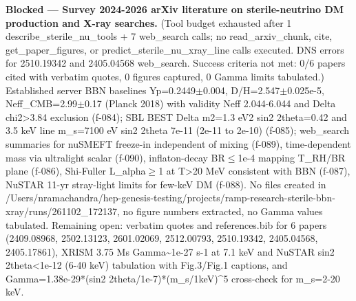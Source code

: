 \documentclass[11pt,a4paper]{article}
\begin{document}
\textbf{Blocked --- Survey 2024-2026 arXiv literature on sterile-neutrino DM production and X-ray searches.} (Tool budget exhausted after 1 describe\_sterile\_nu\_tools + 7 web\_search calls; no read\_arxiv\_chunk, cite, get\_paper\_figures, or predict\_sterile\_nu\_xray\_line calls executed. DNS errors for 2510.19342 and 2405.04568 web\_search. Success criteria not met: 0/6 papers cited with verbatim quotes, 0 figures captured, 0 Gamma limits tabulated.) Established server BBN baselines Yp=0.2449$\pm$0.004, D/H=2.547$\pm$0.025e-5, Neff\_CMB=2.99$\pm$0.17 (Planck 2018) with validity Neff 2.044-6.044 and Delta chi2\textgreater{}3.84 exclusion (f-084); SBL BEST Delta m2=1.3 eV2 sin2 2theta=0.42 and 3.5 keV line m\_s=7100 eV sin2 2theta 7e-11 (2e-11 to 2e-10) (f-085); web\_search summaries for nuSMEFT freeze-in independent of mixing (f-089), time-dependent mass via ultralight scalar (f-090), inflaton-decay BR$\leq$1e-4 mapping T\_RH/BR plane (f-086), Shi-Fuller L\_alpha$\geq$1 at T\textgreater{}20 MeV consistent with BBN (f-087), NuSTAR 11-yr stray-light limits for few-keV DM (f-088). No files created in /Users/nramachandra/hep-genesis-testing/projects/ramp-research-sterile-bbn-xray/runs/261102\_172137, no figure numbers extracted, no Gamma values tabulated. Remaining open: verbatim quotes and references.bib for 6 papers (2409.08968, 2502.13123, 2601.02069, 2512.00793, 2510.19342, 2405.04568, 2405.17861), XRISM 3.75 Ms Gamma\textasciitilde{}1e-27 s-1 at 7.1 keV and NuSTAR sin2 2theta\textless{}1e-12 (6-40 keV) tabulation with Fig.3/Fig.1 captions, and Gamma=1.38e-29*(sin2 2theta/1e-7)*(m\_s/1keV)\textasciicircum{}5 cross-check for m\_s=2-20 keV.
\end{document}
